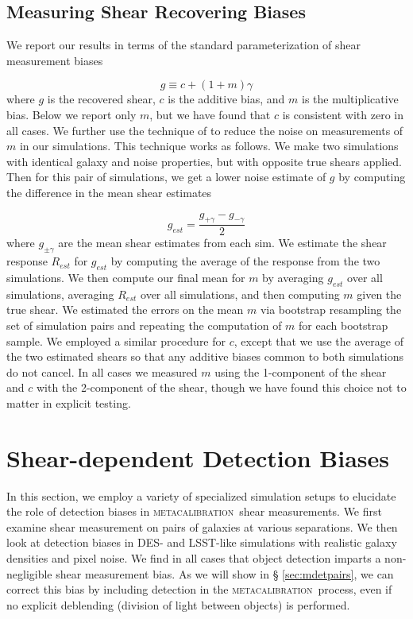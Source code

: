 \documentclass[fleqn,useAMS,usenatbib]{mnras}
\newcommand{\mcal}{\textsc{metacalibration}}
\begin{document}
\subsection{Measuring Shear Recovering Biases}

We report our results in terms of the standard parameterization of shear
measurement biases \citep[see, e.g.,][]{heymans2006}

\begin{equation}
g \equiv c + (1 + m)\gamma
\end{equation}
where $g$ is the recovered shear, $c$ is the additive bias, and $m$ is the
multiplicative bias. Below we report only $m$, but we have found that $c$ is
consistent with zero in all cases. We further use the technique of
\citet{pujol2019} to reduce the noise on measurements of $m$ in our simulations.
This technique works as follows. We make two simulations with identical galaxy
and noise properties, but with opposite true shears applied. Then for this pair
of simulations, we get a lower noise estimate of $g$ by computing the difference
in the mean shear estimates

\begin{equation}
g_{est} = \frac{g_{+\gamma} - g_{-\gamma}}{2}
\end{equation}
where $g_{\pm\gamma}$ are the mean shear estimates from each sim. We estimate
the shear response $R_{est}$ for $g_{est}$ by computing the average of the
response from the two simulations. We then  compute our final mean for $m$ by
averaging $g_{est}$ over all simulations, averaging $R_{est}$ over all
simulations, and then computing $m$ given the true shear. We estimated the
errors on the mean $m$ via bootstrap resampling the set of simulation pairs and
repeating the computation of $m$ for each bootstrap sample. We employed a
similar procedure for $c$, except that we use the average of the two estimated
shears so that any additive biases common to both simulations do not cancel. In
all  cases we measured $m$ using the 1-component of the shear and $c$ with the
2-component of the shear, though we have found this choice not to matter in
explicit testing.

\section{Shear-dependent Detection Biases}\label{sec:detbiases}

In this section, we employ a variety of specialized simulation setups to
elucidate the role of detection biases in \mcal\ shear measurements. We first
examine shear measurement on pairs of galaxies at various separations. We then
look at detection biases in DES- and LSST-like simulations with realistic
galaxy densities and pixel noise. We find in all cases that object detection
imparts a non-negligible shear measurement bias. As we will show in \S
\ref{sec:mdetpairs}, we can correct this bias by including detection in the
\mcal\ process, even if no explicit deblending (division of light between
objects) is performed.
\end{document}
